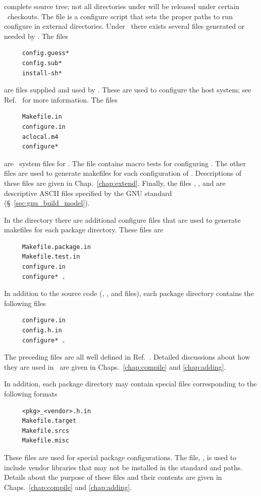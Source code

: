 complete source tree; not all directories under  will be
released under certain \cvs\ checkouts.  The file
 is a configure script that sets the proper paths
to run configure in external directories.  Under \draco\ there exists
several files generated or needed by \autoconf.  The files
\begin{verbatim}
     config.guess*
     config.sub*
     install-sh*
\end{verbatim}
are files supplied and used by \autoconf.  These are used to configure
the host system; see Ref.~\cite{autoconf} for more information.  The
files
\begin{verbatim}
     Makefile.in
     configure.in
     aclocal.m4
     configure*
\end{verbatim}
are \draco\ system files for \autoconf.  The file 
contains macro tests for configuring \draco.  The other files are used
to generate makefiles for each configuration of \draco.  Descriptions
of these files are given in Chap.~\ref{chap:extend}.  Finally, the
files , , and  are
descriptive ASCII files specified by the GNU standard
(\S~\ref{sec:gnu_build_model}).

In the  directory there are additional configure files that
are used to generate makefiles for each package directory.  These
files are
\begin{verbatim}
     Makefile.package.in
     Makefile.test.in
     configure.in
     configure* .
\end{verbatim}
In addition to the source code (, , and 
files), each package directory contains the following files
\begin{verbatim}
     configure.in
     config.h.in
     configure* .
\end{verbatim}
The preceding files are all well defined in Ref.~\cite{autoconf}.
Detailed discussions about how they are used in \draco\ are given in
Chaps.~\ref{chap:compile} and \ref{chap:adding}.

In addition, each package directory may contain special files
corresponding to the following formats
\begin{verbatim}
     <pkg>_<vendor>.h.in
     Makefile.target
     Makefile.srcs
     Makefile.misc
\end{verbatim}
These files are used for special package configurations.  The file,
, is used to include vendor libraries that
may not be installed in the standard  and
 paths.  Details about the purpose of these
files and their contents are given in Chaps.~\ref{chap:compile} and
\ref{chap:adding}. 

